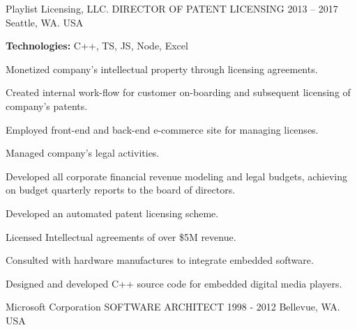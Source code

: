 \begin{cventries}
  \cventry
    {Playlist Licensing, LLC.} %
    {DIRECTOR OF PATENT LICENSING} %
    {2013 – 2017} %
    {Seattle, WA. USA} %
    {
     \begin{cvitems} %
        \item \textbf{Technologies:} C++, TS, JS, Node, Excel
        \item Monetized company’s intellectual property through licensing agreements. 
        \item Created internal work-flow for customer on-boarding and subsequent licensing of company’s patents. 
        \item Employed front-end and back-end e-commerce site for managing licenses. 
        \item Managed company’s legal activities. 
        \item Developed all corporate financial revenue modeling and legal budgets, achieving on budget quarterly reports to the board of directors.
        \item Developed an automated patent licensing scheme.
        \item Licensed Intellectual agreements of over \$5M revenue.
        \item Consulted with hardware manufactures to integrate embedded software.
        \item Designed and developed C++ source code for embedded digital media players.
     \end{cvitems}
    }

  \vspace{-.5mm}
  \cventry
    {Microsoft Corporation } %
    {SOFTWARE ARCHITECT } %
    {1998 - 2012} %
    {Bellevue, WA. USA} %
    {
        \begin{cvitems} %
        \vspace{-3mm}
        \end{cvitems}
    }


\end{cventries}
